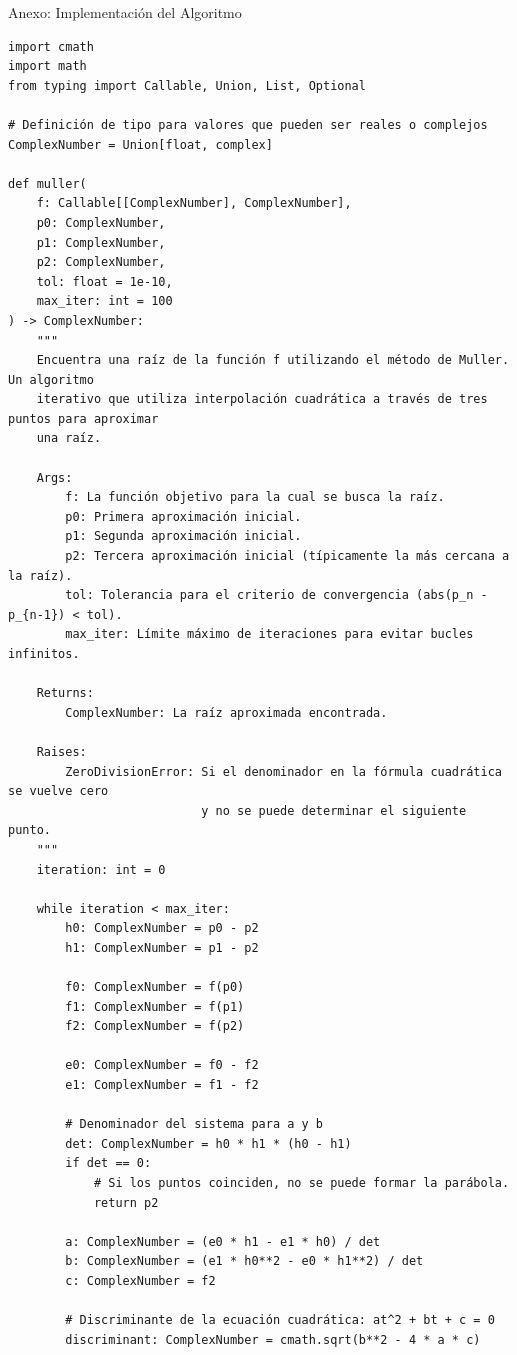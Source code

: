 \documentclass[aspectratio=169, t]{beamer}
\begin{document}
\begin{frame}{Anexo: Implementación del Algoritmo}
\begin{lstlisting}[style=mullerpython]
import cmath
import math
from typing import Callable, Union, List, Optional

# Definición de tipo para valores que pueden ser reales o complejos
ComplexNumber = Union[float, complex]

def muller(
    f: Callable[[ComplexNumber], ComplexNumber],
    p0: ComplexNumber,
    p1: ComplexNumber,
    p2: ComplexNumber,
    tol: float = 1e-10,
    max_iter: int = 100
) -> ComplexNumber:
    """
    Encuentra una raíz de la función f utilizando el método de Muller. Un algoritmo
    iterativo que utiliza interpolación cuadrática a través de tres puntos para aproximar
    una raíz.

    Args:
        f: La función objetivo para la cual se busca la raíz.
        p0: Primera aproximación inicial.
        p1: Segunda aproximación inicial.
        p2: Tercera aproximación inicial (típicamente la más cercana a la raíz).
        tol: Tolerancia para el criterio de convergencia (abs(p_n - p_{n-1}) < tol).
        max_iter: Límite máximo de iteraciones para evitar bucles infinitos.

    Returns:
        ComplexNumber: La raíz aproximada encontrada.
        
    Raises:
        ZeroDivisionError: Si el denominador en la fórmula cuadrática se vuelve cero
                           y no se puede determinar el siguiente punto.
    """
    iteration: int = 0
    
    while iteration < max_iter:
        h0: ComplexNumber = p0 - p2
        h1: ComplexNumber = p1 - p2
        
        f0: ComplexNumber = f(p0)
        f1: ComplexNumber = f(p1)
        f2: ComplexNumber = f(p2)
        
        e0: ComplexNumber = f0 - f2
        e1: ComplexNumber = f1 - f2
        
        # Denominador del sistema para a y b
        det: ComplexNumber = h0 * h1 * (h0 - h1)
        if det == 0:
            # Si los puntos coinciden, no se puede formar la parábola.
            return p2
            
        a: ComplexNumber = (e0 * h1 - e1 * h0) / det
        b: ComplexNumber = (e1 * h0**2 - e0 * h1**2) / det
        c: ComplexNumber = f2
        
        # Discriminante de la ecuación cuadrática: at^2 + bt + c = 0
        discriminant: ComplexNumber = cmath.sqrt(b**2 - 4 * a * c)
        

\end{lstlisting}
\end{frame}
\end{document}

